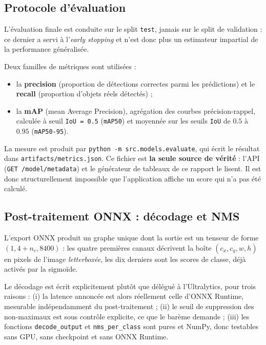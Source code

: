 \documentclass[11pt,a4paper]{article}
\begin{document}
\subsection{Protocole d'évaluation}

L'évaluation finale est conduite sur le split \texttt{test}, jamais sur le
split de validation : ce dernier a servi à l'\emph{early stopping} et
n'est donc plus un estimateur impartial de la performance généralisée.

Deux familles de métriques sont utilisées :
\begin{itemize}[leftmargin=1.2em]
  \item la \textbf{precision} (proportion de détections correctes parmi les
        prédictions) et le \textbf{recall} (proportion d'objets réels
        détectés) ;
  \item la \textbf{mAP} (mean Average Precision), agrégation des courbes
        précision-rappel, calculée à seuil \texttt{IoU = 0.5}
        (\texttt{mAP50}) et moyennée sur les seuils \texttt{IoU} de
        \(0.5\) à \(0.95\) (\texttt{mAP50-95}).
\end{itemize}

La mesure est produit par \texttt{python -m src.models.evaluate}, qui écrit
le résultat dans \texttt{artifacts/metrics.json}. Ce fichier est
\textbf{la seule source de vérité} : l'API (\texttt{GET /model/metadata})
et le générateur de tableaux de ce rapport le lisent. Il est donc
structurellement impossible que l'application affiche un score qui n'a pas
été calculé.

\subsection{Post-traitement ONNX : décodage et NMS}

L'export ONNX produit un graphe unique dont la sortie est un tenseur de
forme \((1, 4 + n_c, 8400)\) : les quatre premières canaux décrivent la
boîte \((c_x, c_y, w, h)\) en pixels de l'image \emph{letterboxée}, les
dix derniers sont les scores de classe, déjà activés par la sigmoïde.

Le décodage est écrit explicitement plutôt que délégué à l'Ultralytics, pour
trois raisons : (i) la latence annoncée est alors réellement celle d'ONNX
Runtime, mesurable indépendamment du post-traitement ; (ii) le seuil de
suppression des non-maximaux est sous contrôle explicite, ce que le barème
demande ; (iii) les fonctions \texttt{decode\_output} et
\texttt{nms\_per\_class} sont pures et NumPy, donc testables sans GPU, sans
checkpoint et sans ONNX Runtime.
\end{document}
